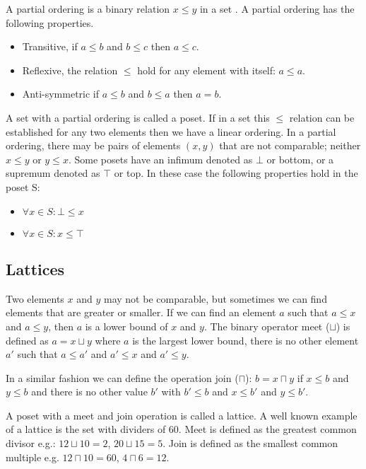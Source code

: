 A partial ordering is a binary relation $ x \leq y$ in a set \citep{algebra}. 
A partial ordering has the following properties.
\begin{itemize}
\item Transitive, if $ a \leq b $ and $ b \leq c $ then $ a \leq c $.
\item Reflexive, the relation $\leq$ hold for any element with itself:  $ a \leq a $.
\item Anti-symmetric if $a \leq b $ and $ b \leq a$ then $ a  = b$.
\end{itemize}

A set with a partial ordering is called a poset.
If in a set this $\leq$ relation can be established for any two elements then we have a linear ordering.
In a partial ordering, there may be pairs of elements $(x,y)$ that are not comparable; neither $ x \leq y$ or $y \leq x$.
Some posets have an infimum denoted as $\bot$ or bottom,  or a supremum denoted as $\top$ or top.
In these case the following properties hold in the poset S:
\begin{itemize}
\item $ \forall x \in S: \bot \leq x $
\item $\forall x \in S: x \leq \top$
\end{itemize}


\subsection{Lattices}


Two elements $x$ and $y$ may not be comparable, but sometimes we can find elements that are greater or smaller.
If we can find an element $a$ such that $ a \leq x $ and $ a \leq y $, then $a$ is a lower bound of $x$ and $y$.
The binary operator meet ($\sqcup$) is defined as $ a = x \sqcup y $ where $a$ is the largest lower bound, 
there is no other element $a'$ such that $ a \leq a' $ and $ a' \leq x $ and $ a' \leq y $.

In a similar fashion we can define the operation join ($ \sqcap $): $ b = x \sqcap y$ if $ x \leq b $ and $ y \leq b $ and there is no other value $b'$ 
with $b' \leq b$ and  $ x \leq b' $ and $ y \leq b' $.

A poset with a meet and join operation is called a lattice.
A well known example of a lattice is the set with dividers of 60.
Meet is defined as the greatest common divisor e.g.: $12 \sqcup 10 = 2$, $20 \sqcup 15 = 5$.
Join is defined as the smallest common multiple e.g. $ 12 \sqcap 10 = 60$, $4 \sqcap 6 = 12$. 

